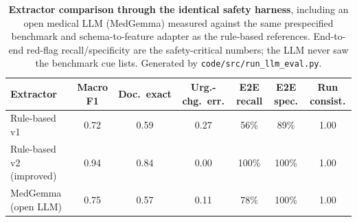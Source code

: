 \begin{table}[htbp]
\centering
\caption{\textbf{Extractor comparison through the identical safety harness}, including an open medical LLM (MedGemma) measured against the same prespecified benchmark and schema-to-feature adapter as the rule-based references. End-to-end red-flag recall/specificity are the safety-critical numbers; the LLM never saw the benchmark cue lists. Generated by \texttt{code/src/run\_llm\_eval.py}.}
\label{tab:llm_compare}
\small
\begin{tabular}{lcccccc}
\toprule
Extractor & Macro F1 & Doc.\ exact & Urg.-chg.\ err. & E2E recall & E2E spec. & Run consist. \\
\midrule
Rule-based v1 & 0.72 & 0.59 & 0.27 & 56\% & 89\% & 1.00 \\
Rule-based v2 (improved) & 0.94 & 0.84 & 0.00 & 100\% & 100\% & 1.00 \\
MedGemma (open LLM) & 0.75 & 0.57 & 0.11 & 78\% & 100\% & 1.00 \\
\bottomrule
\end{tabular}
\end{table}
